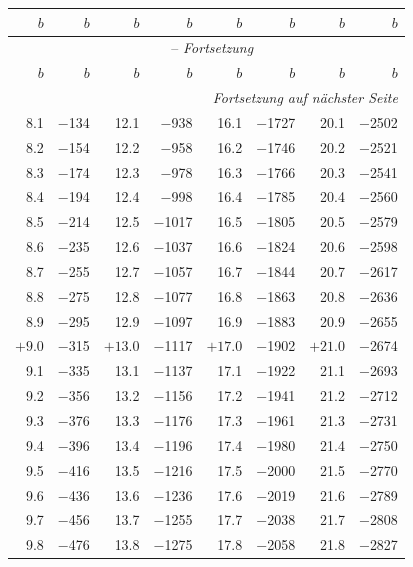 \documentclass[10pt,a4paper]{article}
\begin{document}
\begin{center}
\tiny
\setlength{\tabcolsep}{3pt}
\begin{longtable}{@{}rrrrrrrr@{}}
\toprule
$b$ & $b$ & $b$ & $b$ & $b$ & $b$ & $b$ & $b$ \\
\midrule
\endfirsthead
\multicolumn{8}{c}{\tablename\ \thetable{} -- \textit{Fortsetzung}}\\
\toprule
$b$ & $b$ & $b$ & $b$ & $b$ & $b$ & $b$ & $b$ \\
\midrule
\endhead
\midrule
\multicolumn{8}{r}{\textit{Fortsetzung auf nächster Seite}}
\endfoot
\bottomrule
\endlastfoot
$+8.0$ & $-$113 & $+12.0$ & $-$918 & $+16.0$ & $-$1701 & $+20.0$ & $-$2483 \\
8.1 & $-$134 & 12.1 & $-$938 & 16.1 & $-$1727 & 20.1 & $-$2502 \\
8.2 & $-$154 & 12.2 & $-$958 & 16.2 & $-$1746 & 20.2 & $-$2521 \\
8.3 & $-$174 & 12.3 & $-$978 & 16.3 & $-$1766 & 20.3 & $-$2541 \\
8.4 & $-$194 & 12.4 & $-$998 & 16.4 & $-$1785 & 20.4 & $-$2560 \\
8.5 & $-$214 & 12.5 & $-$1017 & 16.5 & $-$1805 & 20.5 & $-$2579 \\
8.6 & $-$235 & 12.6 & $-$1037 & 16.6 & $-$1824 & 20.6 & $-$2598 \\
8.7 & $-$255 & 12.7 & $-$1057 & 16.7 & $-$1844 & 20.7 & $-$2617 \\
8.8 & $-$275 & 12.8 & $-$1077 & 16.8 & $-$1863 & 20.8 & $-$2636 \\
8.9 & $-$295 & 12.9 & $-$1097 & 16.9 & $-$1883 & 20.9 & $-$2655 \\
$+9.0$ & $-$315 & $+13.0$ & $-$1117 & $+17.0$ & $-$1902 & $+21.0$ & $-$2674 \\
9.1 & $-$335 & 13.1 & $-$1137 & 17.1 & $-$1922 & 21.1 & $-$2693 \\
9.2 & $-$356 & 13.2 & $-$1156 & 17.2 & $-$1941 & 21.2 & $-$2712 \\
9.3 & $-$376 & 13.3 & $-$1176 & 17.3 & $-$1961 & 21.3 & $-$2731 \\
9.4 & $-$396 & 13.4 & $-$1196 & 17.4 & $-$1980 & 21.4 & $-$2750 \\
9.5 & $-$416 & 13.5 & $-$1216 & 17.5 & $-$2000 & 21.5 & $-$2770 \\
9.6 & $-$436 & 13.6 & $-$1236 & 17.6 & $-$2019 & 21.6 & $-$2789 \\
9.7 & $-$456 & 13.7 & $-$1255 & 17.7 & $-$2038 & 21.7 & $-$2808 \\
9.8 & $-$476 & 13.8 & $-$1275 & 17.8 & $-$2058 & 21.8 & $-$2827 \\

\end{longtable}
\end{center}
\end{document}
